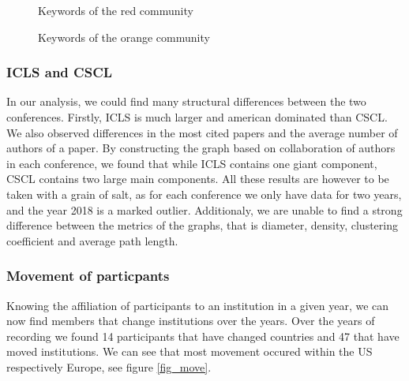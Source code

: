 \documentclass[article,twocolumn]{IEEEtran}
\begin{document}
    \begin{figure}
        \begin{center}\end{center}
        \caption{Keywords of the red community}
        \label{c2}
    \end{figure}
    

    \begin{figure}
        \begin{center}\end{center}
        \caption{Keywords of the orange community}
        \label{c3}
    \end{figure}
    
    \hypertarget{icls-and-cscl}{%
\subsubsection{ICLS and CSCL}\label{icls-and-cscl}}

In our analysis, we could find many structural differences between the
two conferences. Firstly, ICLS is much larger and american dominated
than CSCL. We also observed differences in the most cited papers and the
average number of authors of a paper. By constructing the graph based on
collaboration of authors in each conference, we found that while ICLS
contains one giant component, CSCL contains two large main components.
All these results are however to be taken with a grain of salt, as for
each conference we only have data for two years, and the year 2018 is a
marked outlier. Additionaly, we are unable to find a strong difference
between the metrics of the graphs, that is diameter, density, clustering
coefficient and average path length.

    \hypertarget{movement-of-particpants}{%
\subsubsection{Movement of particpants}\label{movement-of-particpants}}

Knowing the affiliation of participants to an institution in a given
year, we can now find members that change institutions over the years.
Over the years of recording we found 14 participants that have changed
countries and 47 that have moved institutions. We can see that most
movement occured within the US respectively Europe, see figure
\ref{fig_move}.
\end{document}
